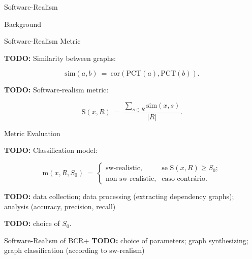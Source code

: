 \documentclass[11pt,twocolumn,a4paper,english]{article}
\newcommand{\TODO}{\textbf{TODO:} }
\begin{document}
\begin{section}{Software-Realism}
\begin{subsection}{Background}
	\end{subsection}
	
\begin{subsection}{Software-Realism Metric}
	
	
	\TODO Similarity between graphs:
	
	$$
  \mathrm{sim}(a, b) ~=~ 
    \mathrm{cor}(\mathrm{PCT}(a), \mathrm{PCT}(b))\mathrm{.}
  $$
	
	
	\TODO Software-realism metric:
	
	$$
  \mathrm{S}(x, R) ~=~ \frac{
  \displaystyle\sum_{s \in R} \mathrm{sim}(x, s)
  }{|R|} \mbox{.}
  $$

\end{subsection}
	
\begin{subsection}{Metric Evaluation}
	
	\TODO Classification model:
	
	$$
	  \mathrm{m}(x, R, S_0) ~=~
	  \left\{
	  \begin{array}{cl}
	  \mbox{sw-realistic,} & \mbox{se } \mathrm{S}(x, R) \ge S_0; \\
	  \mbox{non sw-realistic,} & \mbox{caso contrário.}
	  \end{array}
	  \right.
	$$	
	
	\TODO data collection; data processing (extracting dependency graphs); analysis (accuracy, precision, recall)
	
	\TODO choice of $S_0$.
	
\end{subsection}
	
\begin{subsection}{Software-Realism of BCR+}
	\TODO choice of parameters; graph synthesizing; graph classification (according to sw-realism)
\end{subsection}
	
\end{section}

\end{document}
